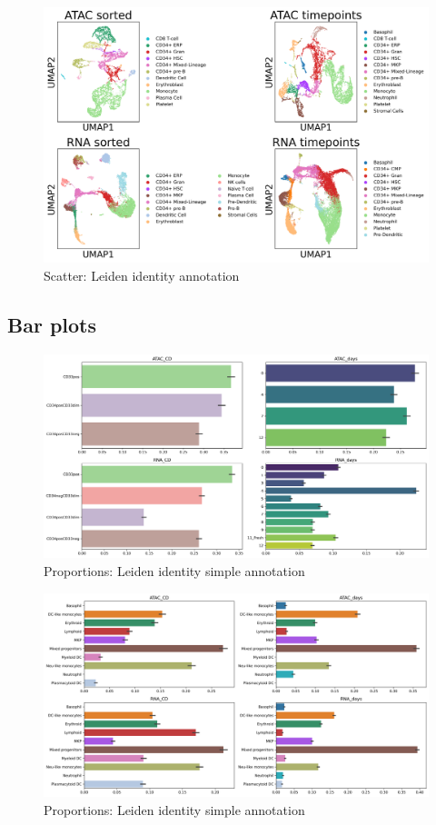 \documentclass[a4paper]{article}
\begin{document}
\begin{figure}[!htb]
  \centering
  \includegraphics[width=\textwidth]{../figures/hematopoiesis/leiden_identity.png}
  \caption{Scatter: Leiden identity annotation}
\end{figure}

\FloatBarrier
\subsection{Bar plots}

\begin{figure}[!htb]
  \centering
  \includegraphics[width=\textwidth]{../figures/hematopoiesis/label_proportions.png}
  \caption{Proportions: Leiden identity simple annotation}
\end{figure}

\begin{figure}[!htb]
  \centering
  \includegraphics[width=\textwidth]{../figures/hematopoiesis/leiden_identity_simple2_proportions.png}
  \caption{Proportions: Leiden identity simple annotation}
\end{figure}
\end{document}

